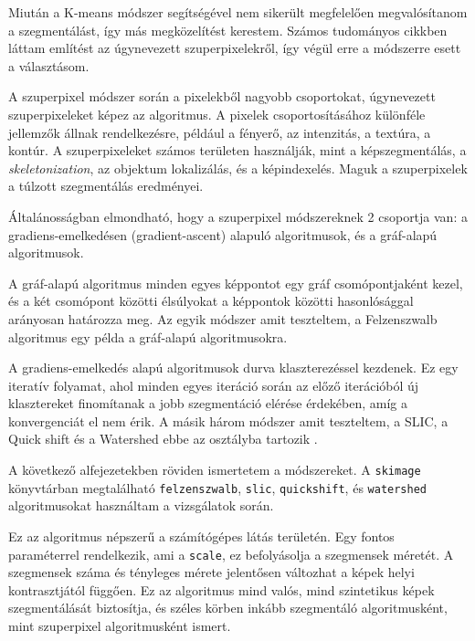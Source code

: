 
Miután a K-means módszer segítségével nem sikerült megfelelően megvalósítanom a szegmentálást, így más megközelítést kerestem. Számos tudományos cikkben láttam említést az úgynevezett szuperpixelekről, így végül erre a módszerre esett a választásom.

A szuperpixel módszer során a pixelekből nagyobb csoportokat, úgynevezett szuperpixeleket képez az algoritmus. A pixelek csoportosításához különféle jellemzők állnak rendelkezésre, például a fényerő, az intenzitás, a textúra, a kontúr. A szuperpixeleket számos területen használják, mint a képszegmentálás, a \textit{skeletonization}, az objektum lokalizálás, és a képindexelés. Maguk a szuperpixelek a túlzott szegmentálás eredményei.

Általánosságban elmondható, hogy a szuperpixel módszereknek 2 csoportja van: a gradiens-emelkedésen (gradient-ascent) alapuló algoritmusok, és a gráf-alapú algoritmusok.

A gráf-alapú algoritmus minden egyes képpontot egy gráf csomópontjaként kezel, és a két csomópont közötti élsúlyokat a képpontok közötti hasonlósággal arányosan határozza meg. Az egyik módszer amit teszteltem, a Felzenszwalb algoritmus egy példa a gráf-alapú algoritmusokra.

A gradiens-emelkedés alapú algoritmusok durva klaszterezéssel kezdenek. Ez egy iteratív folyamat, ahol minden egyes iteráció során az előző iterációból új klasztereket finomítanak a jobb szegmentáció elérése érdekében, amíg a konvergenciát el nem érik. A másik három módszer amit teszteltem, a SLIC, a Quick shift és a Watershed ebbe az osztályba tartozik \cite{superpixel}.

A következő alfejezetekben röviden ismertetem a módszereket. A \texttt{skimage} könyvtárban megtalálható \texttt{felzenszwalb}, \texttt{slic}, \texttt{quickshift}, és \texttt{watershed} algoritmusokat használtam a vizsgálatok során.


Ez az algoritmus népszerű a számítógépes látás területén. Egy fontos paraméterrel rendelkezik, ami a \texttt{scale}, ez befolyásolja a szegmensek méretét. A szegmensek száma és tényleges mérete jelentősen változhat a képek helyi kontrasztjától függően. Ez az algoritmus mind valós, mind szintetikus képek szegmentálását biztosítja, és széles körben inkább szegmentáló algoritmusként, mint szuperpixel algoritmusként ismert.

